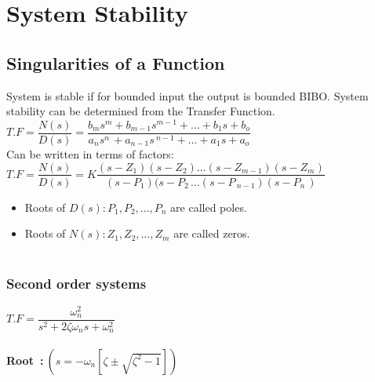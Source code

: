 \setchapterpreamble[u]{\margintoc}
\chapter[System Stability ($4^{th}$ Lecture)]{System Stability}

\section{Singularities of a Function}

System is stable if for bounded input the output is bounded BIBO. System stability can be determined from the Transfer Function.\\[+1em]

$T.F = \dfrac{N(s)}{D(s)} = \dfrac{b_ms^m+b_{m-1}s^{m-1}+\ldots+b_1s+b_o}{a_ns^{n\ }+a_{n-1}s^{\ n-1}+\ldots+a_1s+a_o}$\\[+1em]

Can be written in terms of factors:\\[+1em]

$T.F = \dfrac{N(s)}{D(s)} = K \dfrac{(s-Z_1)(s-Z_2)\ldots(s-Z_{m-1})(s-Z_m)}{(s-P_1)(s-P_{2\ }\ldots(s-P_{\ n-1})(s-P_{n\ })}$\\[+2em]

\begin{itemize}
  \item  Roots of $D(s): P_1, P_2, \ldots, P_n$ are called poles.\\
  \item  Roots of $N(s): Z_1, Z_2, \ldots, Z_m$ are called zeros.\\
  \\
\end{itemize}


\vspace{-0.5cm}
\subsection{Second order systems}

\centering
$T.F = \dfrac{\omega_n^2}{s^2+2\zeta\omega_ns+\omega_n^2}$
\justify

\subsubsection{Root\ :$\ ( s = - \omega_n [\zeta \pm \sqrt{\zeta^2-1}] ) $} 

